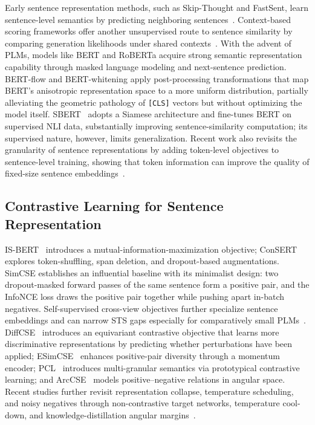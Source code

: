 \documentclass[a4paper,fleqn]{cas-dc}
\begin{document}
Early sentence representation methods, such as Skip-Thought and FastSent, learn sentence-level semantics by predicting neighboring sentences~\cite{nguyen2026embedtrace}.
Context-based scoring frameworks offer another unsupervised route to sentence similarity by comparing generation likelihoods under shared contexts~\cite{sunctxsim}.
With the advent of PLMs, models like BERT and RoBERTa acquire strong semantic representation capability through masked language modeling and next-sentence prediction. BERT-flow and BERT-whitening apply post-processing transformations that map BERT's anisotropic representation space to a more uniform distribution, partially alleviating the geometric pathology of \texttt{[CLS]} vectors but without optimizing the model itself. SBERT~\cite{sbert} adopts a Siamese architecture and fine-tunes BERT on supervised NLI data, substantially improving sentence-similarity computation; its supervised nature, however, limits generalization. Recent work also revisits the granularity of sentence representations by adding token-level objectives to sentence-level training, showing that token information can improve the quality of fixed-size sentence embeddings~\cite{mexma}.

\subsection{Contrastive Learning for Sentence Representation}

IS-BERT~\cite{isbert} introduces a mutual-information-maximization objective; ConSERT~\cite{consert} explores token-shuffling, span deletion, and dropout-based augmentations. SimCSE establishes an influential baseline with its minimalist design: two dropout-masked forward passes of the same sentence form a positive pair, and the InfoNCE loss draws the positive pair together while pushing apart in-batch negatives.
Self-supervised cross-view objectives further specialize sentence embeddings and can narrow STS gaps especially for comparatively small PLMs~\cite{sct}.
DiffCSE~\cite{diffcse} introduces an equivariant contrastive objective that learns more discriminative representations by predicting whether perturbations have been applied; ESimCSE~\cite{esimcse} enhances positive-pair diversity through a momentum encoder; PCL~\cite{pcl} introduces multi-granular semantics via prototypical contrastive learning; and ArcCSE~\cite{arccse} models positive--negative relations in angular space. Recent studies further revisit representation collapse, temperature scheduling, and noisy negatives through non-contrastive target networks, temperature cool-down, and knowledge-distillation angular margins~\cite{unsee,tempcooldown,kdmcse}.
\end{document}
